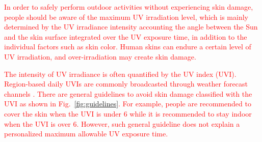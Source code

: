 \documentclass[journal]{IEEEtran}
\begin{document}
\textcolor{red}{In order to safely perform outdoor activities without experiencing skin damage, people should be aware of the maximum UV irradiation level, which is mainly determined by the UV irradiance intensity accounting the angle between the Sun and the skin surface integrated over the UV exposure time, in addition to the individual factors such as skin color. Human skins can endure a certain level of UV irradiation, and over-irradiation may create skin damage.}

\textcolor{red}{The intensity of UV irradiance is often quantified by the UV index (UVI). Region-based daily UVIs are commonly broadcasted through weather forecast channels . There are general guidelines to avoid skin damage classified with  the UVI as shown in Fig.~\ref{fig:guidelines}. For example, people are recommended to cover the skin when the UVI is under 6 while it is recommended to stay indoor when the UVI  is over 6. However, such general guideline does not explain a personalized maximum allowable UV exposure time.}
\end{document}
